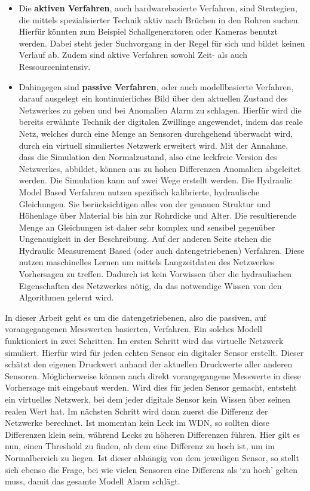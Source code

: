 \begin{itemize}
    
    \item Die \textbf{aktiven Verfahren}, auch hardwarebasierte Verfahren, sind Strategien, die mittels
     spezialisierter Technik aktiv nach Brüchen in den Rohren suchen. Hierfür könnten zum Beispiel
     Schallgeneratoren oder Kameras benutzt werden. Dabei steht jeder Suchvorgang in der Regel für sich
     und bildet keinen Verlauf ab. Zudem sind aktive Verfahren sowohl Zeit- als auch Ressourcenintensiv.

    \item Dahingegen sind \textbf{passive Verfahren}, oder auch modellbasierte Verfahren, darauf ausgelegt
     ein kontinuierliches Bild über den aktuellen Zustand des Netzwerkes zu geben und bei Anomalien Alarm zu
     schlagen. Hierfür wird die bereits erwähnte Technik der digitalen Zwillinge angewendet, indem das reale
     Netz, welches durch eine Menge an Sensoren durchgehend überwacht wird, durch ein virtuell simuliertes
     Netzwerk erweitert wird. Mit der Annahme, dass die Simulation den Normalzustand, also eine leckfreie
     Version des Netzwerkes, abbildet, können aus zu hohen Differenzen Anomalien abgeleitet werden. Die
     Simulation kann auf zwei Wege erstellt werden. Die Hydraulic Model Based Verfahren nutzen spezifisch
     kalibrierte, hydraulische Gleichungen. Sie berücksichtigen alles von der genauen Struktur und Höhenlage
     über Material bis hin zur Rohrdicke und Alter. Die resultierende Menge an Gleichungen ist daher sehr
     komplex und sensibel gegenüber Ungenauigkeit in der Beschreibung. Auf der anderen Seite stehen die
     Hydraulic Measurement Based (oder auch datengetriebenen) Verfahren. Diese nutzen maschinelles Lernen um
     mittels Langzeitdaten des Netzwerkes Vorhersagen zu treffen. Dadurch ist kein Vorwissen über die
     hydraulischen Eigenschaften des Netzwerkes nötig, da das notwendige Wissen von den Algorithmen gelernt wird.
    
\end{itemize}

In dieser Arbeit geht es um die datengetriebenen, also die passiven, auf vorangegangenen Messwerten
 basierten, Verfahren. Ein solches Modell funktioniert in zwei Schritten. Im ersten Schritt wird das
 virtuelle Netzwerk simuliert. Hierfür wird für jeden echten Sensor ein digitaler Sensor erstellt. Dieser
 schätzt den eigenen Druckwert anhand der aktuellen Druckwerte aller anderen Sensoren. Möglicherweise können
 auch direkt vorangegangene Messwerte in diese Vorhersage mit eingebaut werden. Wird dies für jeden Sensor
 gemacht, entsteht ein virtuelles Netzwerk, bei dem jeder digitale Sensor kein Wissen über seinen realen Wert
 hat. Im nächsten Schritt wird dann zuerst die Differenz der Netzwerke berechnet. Ist momentan kein Leck im
 WDN, so sollten diese Differenzen klein sein, während Lecks zu höheren Differenzen führen. Hier gilt es nun,
 einen Threshold zu finden, ab dem eine Differenz zu hoch ist, um im Normalbereich zu liegen. Ist dieser
 abhängig von dem jeweiligen Sensor, so stellt sich ebenso die Frage, bei wie vielen Sensoren eine Differenz
 als ‘zu hoch’ gelten muss, damit das gesamte Modell Alarm schlägt.

